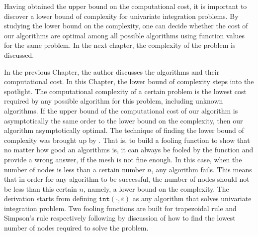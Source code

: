 \documentclass{iitthesis}
\theoremstyle{definition}
\theoremstyle{remark}
\begin{document}
Having obtained the upper bound on the computational cost, it is important to discover a lower bound of complexity for univariate integration problems. By studying the lower bound on the complexity, one can decide whether the cost of our algorithms are optimal among all possible algorithms using function values for the same problem. In the next chapter, the complexity of the problem is discussed.


In the previous Chapter, the author discusses the algorithms and their computational cost. In this Chapter, the lower bound of complexity steps into the spotlight. The computational complexity of a certain problem is the lowest cost required by any possible algorithm for this problem, including unknown algorithms. If the upper bound of the computational cost of our algorithm is asymptotically the same order to the lower bound on the complexity, then our algorithm asymptotically optimal. The technique of finding the lower bound of complexity was brought up by \cite[p.\ 11--12]{TraWer98}. That is, to build a fooling function to show that no matter how good an algorithms is, it can always be fooled by the function and provide a wrong answer, if the mesh is not fine enough. In this case, when the number of nodes is less than a certain number $n$, any algorithm fails. This means that in order for any algorithm to be successful, the number of nodes should not be less than this certain $n$, namely, a lower bound on the complexity. The derivation starts from defining $\texttt{int}(\cdot,\varepsilon)$ as any algorithm that solves univariate integration problem.  Two fooling functions are built for trapezoidal rule and Simpson's rule respectively following by discussion of how to find the lowest number of nodes required to solve the problem.

\end{document}
